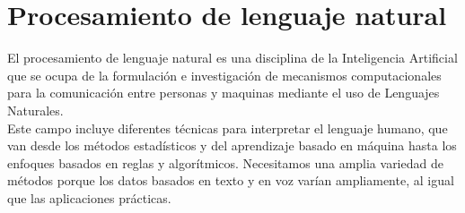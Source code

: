 
\section[PLN]{Procesamiento de lenguaje natural}

El procesamiento de lenguaje natural es una disciplina de la Inteligencia Artificial que se ocupa de la formulación e 
investigación de mecanismos computacionales para la comunicación entre personas y maquinas mediante el uso de Lenguajes 
Naturales.\\

Este campo incluye diferentes técnicas para interpretar el lenguaje humano, que van desde los métodos 
estadísticos y del aprendizaje basado en máquina hasta los enfoques basados en reglas y algorítmicos. Necesitamos una amplia variedad 
de métodos porque los datos basados en texto y en voz varían ampliamente, al igual que las aplicaciones prácticas. 



